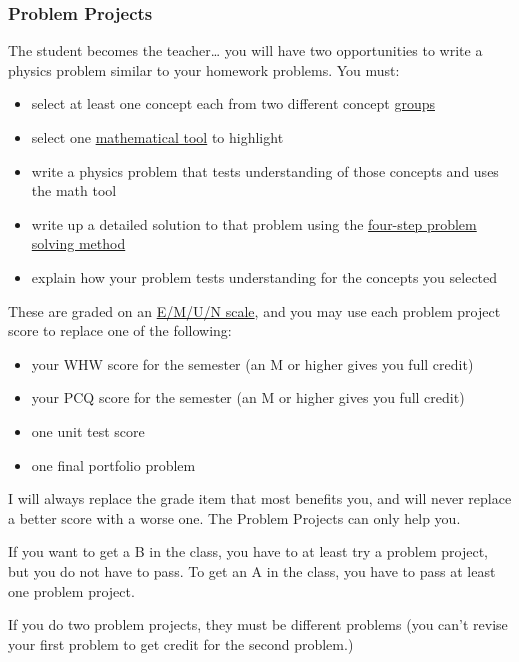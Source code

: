 \documentclass[
  letterpaper,
  DIV=11,
  numbers=noendperiod]{scrartcl}
\providecommand{\tightlist}{%
  \setlength{\itemsep}{0pt}\setlength{\parskip}{0pt}}\usepackage{longtable,booktabs,array}
\begin{document}
\subsubsection{Problem Projects}

The student becomes the teacher\ldots{} you will have two opportunities
to write a physics problem similar to your homework problems. You must:

\begin{itemize}
\tightlist
\item
  select at least one concept each from two different concept
  \href{coursecontent.qmd\#concepts}{groups}
\item
  select one \href{coursecontent.qmd\#mathtools}{mathematical tool} to
  highlight
\item
  write a physics problem that tests understanding of those concepts and
  uses the math tool
\item
  write up a detailed solution to that problem using the
  \href{coursecontent.qmd\#fourstepmethod}{four-step problem solving
  method}
\item
  explain how your problem tests understanding for the concepts you
  selected
\end{itemize}

These are graded on an \hyperref[emun]{E/M/U/N scale}, and you may use
each problem project score to replace one of the following:

\begin{itemize}
\tightlist
\item
  your WHW score for the semester (an M or higher gives you full credit)
\item
  your PCQ score for the semester (an M or higher gives you full credit)
\item
  one unit test score
\item
  one final portfolio problem
\end{itemize}

I will always replace the grade item that most benefits you, and will
never replace a better score with a worse one. The Problem Projects can
only help you.

If you want to get a B in the class, you have to at least try a problem
project, but you do not have to pass. To get an A in the class, you have
to pass at least one problem project.

If you do two problem projects, they must be different problems (you
can't revise your first problem to get credit for the second problem.)
\end{document}
